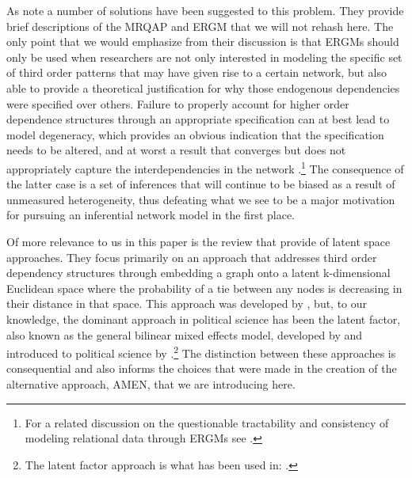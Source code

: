 As \citet{cranmer:etal:2016} note a number of solutions have been suggested to this problem. They provide brief descriptions of the MRQAP and ERGM that we will not rehash here. The only point that we would emphasize from their discussion is that ERGMs should only be used when researchers are not only interested in modeling the specific set of third order patterns that may have given rise to a certain network, but also able to provide a theoretical justification for why those endogenous dependencies were specified over others. Failure to properly account for higher order dependence structures through an appropriate specification can at best lead to model degeneracy, which provides an obvious indication that the specification needs to be altered, and at worst a result that converges but does not appropriately capture the interdependencies in the network \citep{handcock:2003b,hunter:etal:2012}.\footnote{For a related discussion on the questionable tractability and consistency of modeling relational data through ERGMs see \citet{bhamidi:etal:2008,chatterjee:diaconis:2013,chandrasekhar:jackson:2014}.} The consequence of the latter case is a set of inferences that will continue to be biased as a result of unmeasured heterogeneity, thus defeating what we see to be a major motivation for pursuing an inferential network model in the first place. 



Of more relevance to us in this paper is the review that \citet{cranmer:etal:2016} provide of latent space approaches. They focus primarily on an approach that addresses third order dependency structures through embedding a graph onto a latent k-dimensional Euclidean space where the probability of a tie between any nodes is decreasing in their distance in that space. This approach was developed by \citet{hoff:etal:2002}, but, to our knowledge, the dominant approach in political science has been the latent factor, also known as the general bilinear mixed effects model, developed by \citet{hoff:2005} and introduced to political science by \citet{hoff:ward:2004}.\footnote{The latent factor approach is what has been used in: \citet{ward:etal:2007,ward:hoff:2007,cao:ward:2014,ward:etal:2013,metternich:etal:2015}.} The distinction between these approaches is consequential and also informs the choices that were made in the creation of the alternative approach, AMEN, that we are introducing here. 

